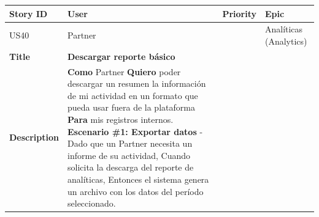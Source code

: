 {\def\LTcaptype{none} %
\begin{longtable}[]{@{}
  >{\raggedright\arraybackslash}p{}
  >{\raggedright\arraybackslash}p{}
  >{\raggedright\arraybackslash}p{}
  >{\raggedright\arraybackslash}p{}@{}}
\toprule\noalign{}
\begin{minipage}[b]{\linewidth}\raggedright
Story ID
\end{minipage} & \begin{minipage}[b]{\linewidth}\raggedright
User
\end{minipage} & \begin{minipage}[b]{\linewidth}\raggedright
Priority
\end{minipage} & \begin{minipage}[b]{\linewidth}\raggedright
Epic
\end{minipage} \\
\midrule\noalign{}
\endhead
\bottomrule\noalign{}
\endlastfoot
US40 & Partner & 5 & Analíticas (Analytics) \\
\textbf{Title} & \textbf{Descargar reporte básico} & & \\
\textbf{Description} & \textbf{Como} Partner \textbf{Quiero} poder
descargar un resumen la información de mi actividad en un formato que
pueda usar fuera de la plataforma \textbf{Para} mis registros internos.
\textbf{Escenario \#1: Exportar datos} - Dado que un Partner necesita un
informe de su actividad, Cuando solicita la descarga del reporte de
analíticas, Entonces el sistema genera un archivo con los datos del
período seleccionado. & & \\
\end{longtable}
}

